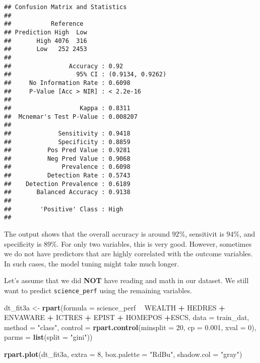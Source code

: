 \documentclass[]{book}
\newenvironment{Shaded}{\begin{snugshade}}{\end{snugshade}}
\newcommand{\DataTypeTok}[1]{\textcolor[rgb]{0.13,0.29,0.53}{#1}}
\newcommand{\DecValTok}[1]{\textcolor[rgb]{0.00,0.00,0.81}{#1}}
\newcommand{\FloatTok}[1]{\textcolor[rgb]{0.00,0.00,0.81}{#1}}
\newcommand{\KeywordTok}[1]{\textcolor[rgb]{0.13,0.29,0.53}{\textbf{#1}}}
\newcommand{\NormalTok}[1]{#1}
\newcommand{\OperatorTok}[1]{\textcolor[rgb]{0.81,0.36,0.00}{\textbf{#1}}}
\newcommand{\StringTok}[1]{\textcolor[rgb]{0.31,0.60,0.02}{#1}}
\begin{document}
\begin{verbatim}
## Confusion Matrix and Statistics
## 
##           Reference
## Prediction High  Low
##       High 4076  316
##       Low   252 2453
##                                           
##                Accuracy : 0.92            
##                  95% CI : (0.9134, 0.9262)
##     No Information Rate : 0.6098          
##     P-Value [Acc > NIR] : < 2.2e-16       
##                                           
##                   Kappa : 0.8311          
##  Mcnemar's Test P-Value : 0.008207        
##                                           
##             Sensitivity : 0.9418          
##             Specificity : 0.8859          
##          Pos Pred Value : 0.9281          
##          Neg Pred Value : 0.9068          
##              Prevalence : 0.6098          
##          Detection Rate : 0.5743          
##    Detection Prevalence : 0.6189          
##       Balanced Accuracy : 0.9138          
##                                           
##        'Positive' Class : High            
## 
\end{verbatim}

The output shows that the overall accuracy is around \(92\%\), sensitivit is \(94\%\), and specificity is \(89\%\). For only two variables, this is very good. However, sometimes we do not have predictors that are highly correlated with the outcome variables. In such cases, the model tuning might take much longer.

Let's assume that we did \textbf{NOT} have reading and math in our dataset. We still want to predict \texttt{science\_perf} using the remaining variables.

\begin{Shaded}
\begin{Highlighting}[]
\NormalTok{dt_fit3a <-}\StringTok{ }\KeywordTok{rpart}\NormalTok{(}\DataTypeTok{formula =}\NormalTok{ science_perf }\OperatorTok{~}\StringTok{ }\NormalTok{WEALTH }\OperatorTok{+}\StringTok{ }\NormalTok{HEDRES }\OperatorTok{+}\StringTok{ }\NormalTok{ENVAWARE }\OperatorTok{+}\StringTok{ }\NormalTok{ICTRES }\OperatorTok{+}\StringTok{ }\NormalTok{EPIST }\OperatorTok{+}\StringTok{ }
\StringTok{                   }\NormalTok{HOMEPOS }\OperatorTok{+}\NormalTok{ESCS,}
                 \DataTypeTok{data =}\NormalTok{ train_dat,}
                 \DataTypeTok{method =} \StringTok{"class"}\NormalTok{, }
                 \DataTypeTok{control =} \KeywordTok{rpart.control}\NormalTok{(}\DataTypeTok{minsplit =} \DecValTok{20}\NormalTok{, }
                                         \DataTypeTok{cp =} \FloatTok{0.001}\NormalTok{, }
                                         \DataTypeTok{xval =} \DecValTok{0}\NormalTok{),}
                \DataTypeTok{parms =} \KeywordTok{list}\NormalTok{(}\DataTypeTok{split =} \StringTok{"gini"}\NormalTok{))}

\KeywordTok{rpart.plot}\NormalTok{(dt_fit3a, }\DataTypeTok{extra =} \DecValTok{8}\NormalTok{, }\DataTypeTok{box.palette =} \StringTok{"RdBu"}\NormalTok{, }\DataTypeTok{shadow.col =} \StringTok{"gray"}\NormalTok{)}
\end{Highlighting}
\end{Shaded}
\end{document}
